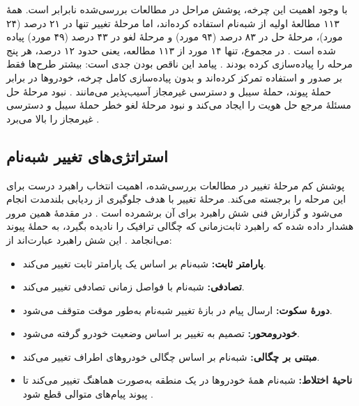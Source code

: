 با وجود اهمیت این چرخه، پوشش مراحل در مطالعات بررسی‌شده نابرابر است. همهٔ ۱۱۳ مطالعهٔ اولیه از شبه‌نام استفاده کرده‌اند، اما مرحلهٔ تغییر تنها در ۲۱ درصد (۲۴ مورد)، مرحلهٔ حل در ۸۳ درصد (۹۴ مورد) و مرحلهٔ لغو در ۴۳ درصد (۴۹ مورد) پیاده شده است \cite{rahmawatiagustinaSystematicLiteratureReview2025}. در مجموع، تنها ۱۴ مورد از ۱۱۳ مطالعه، یعنی حدود ۱۲ درصد، هر پنج مرحله را پیاده‌سازی کرده بودند \cite{rahmawatiagustinaSystematicLiteratureReview2025}. پیامد این ناقص بودن جدی است: بیشتر طرح‌ها فقط بر صدور و استفاده تمرکز کرده‌اند و بدون پیاده‌سازی کامل چرخه، خودروها در برابر حملهٔ پیوند، حملهٔ سیبل و دسترسی غیرمجاز آسیب‌پذیر می‌مانند \cite{rahmawatiagustinaSystematicLiteratureReview2025}. نبود مرحلهٔ حل مسئلهٔ مرجع حل هویت را ایجاد می‌کند و نبود مرحلهٔ لغو خطر حملهٔ سیبل و دسترسی غیرمجاز را بالا می‌برد \cite{rahmawatiagustinaSystematicLiteratureReview2025}.

\subsection{استراتژی‌های تغییر شبه‌نام }

پوشش کم مرحلهٔ تغییر در مطالعات بررسی‌شده، اهمیت انتخاب راهبرد درست برای این مرحله را برجسته می‌کند. مرحلهٔ تغییر با هدف جلوگیری از ردیابی بلندمدت انجام می‌شود و گزارش فنی  شش راهبرد برای آن برشمرده است \cite{rahmawatiagustinaSystematicLiteratureReview2025}. در مقدمهٔ همین مرور هشدار داده شده که راهبرد ثابت‌زمانی که چگالی ترافیک را نادیده بگیرد، به حملهٔ پیوند می‌انجامد \cite{rahmawatiagustinaSystematicLiteratureReview2025}. این شش راهبرد عبارت‌اند از:

\begin{itemize}
  \item \textbf{پارامتر ثابت:} شبه‌نام بر اساس یک پارامتر ثابت تغییر می‌کند.
  \item \textbf{تصادفی:} شبه‌نام با فواصل زمانی تصادفی تغییر می‌کند.
  \item \textbf{دورهٔ سکوت:} ارسال پیام در بازهٔ تغییر شبه‌نام به‌طور موقت متوقف می‌شود.
  \item \textbf{خودرومحور:} تصمیم به تغییر بر اساس وضعیت خودرو گرفته می‌شود.
  \item \textbf{مبتنی بر چگالی:} شبه‌نام بر اساس چگالی خودروهای اطراف تغییر می‌کند.
  \item \textbf{ناحیهٔ اختلاط:} شبه‌نام همهٔ خودروها در یک منطقه به‌صورت هماهنگ تغییر می‌کند تا پیوند پیام‌های متوالی قطع شود \cite{VanetSecurityPrivacy}.
\end{itemize}

